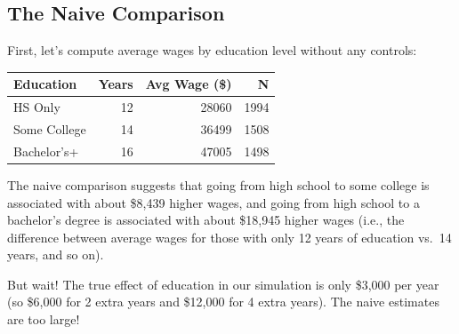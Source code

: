 \documentclass[
  letterpaper,
  DIV=11,
  numbers=noendperiod]{scrreprt}
\newenvironment{Shaded}{\begin{snugshade}}{\end{snugshade}}
\newcommand{\AttributeTok}[1]{\textcolor[rgb]{0.40,0.45,0.13}{#1}}
\newcommand{\DecValTok}[1]{\textcolor[rgb]{0.68,0.00,0.00}{#1}}
\newcommand{\FunctionTok}[1]{\textcolor[rgb]{0.28,0.35,0.67}{#1}}
\newcommand{\NormalTok}[1]{\textcolor[rgb]{0.00,0.23,0.31}{#1}}
\newcommand{\OtherTok}[1]{\textcolor[rgb]{0.00,0.23,0.31}{#1}}
\newcommand{\SpecialCharTok}[1]{\textcolor[rgb]{0.37,0.37,0.37}{#1}}
\newcommand{\StringTok}[1]{\textcolor[rgb]{0.13,0.47,0.30}{#1}}
\newcounter{none} %
\begin{document}
\subsection{The Naive Comparison}\label{the-naive-comparison}

First, let's compute average wages by education level without any
controls:

\begin{Shaded}
\end{Shaded}

{\def\LTcaptype{none} %
\begin{longtable}[]{@{}lrrr@{}}
\toprule\noalign{}
Education & Years & Avg Wage (\$) & N \\
\midrule\noalign{}
\endhead
\bottomrule\noalign{}
\endlastfoot
HS Only & 12 & 28060 & 1994 \\
Some College & 14 & 36499 & 1508 \\
Bachelor's+ & 16 & 47005 & 1498 \\
\end{longtable}
}

The naive comparison suggests that going from high school to some
college is associated with about \$8,439 higher wages, and going from
high school to a bachelor's degree is associated with about \$18,945
higher wages (i.e., the difference between average wages for those with
only 12 years of education vs.~14 years, and so on).

But wait! The true effect of education in our simulation is only \$3,000
per year (so \$6,000 for 2 extra years and \$12,000 for 4 extra years).
The naive estimates are too large!
\end{document}
